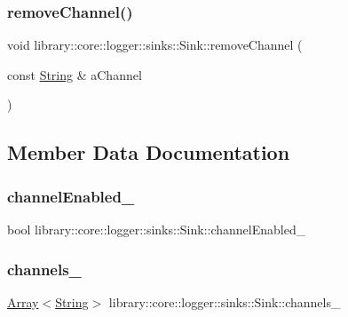 \subsubsection{\texorpdfstring{removeChannel()}{removeChannel()}}
{\footnotesize\ttfamily void library\+::core\+::logger\+::sinks\+::\+Sink\+::remove\+Channel (\begin{DoxyParamCaption}\item[{const \mbox{\hyperlink{classlibrary_1_1core_1_1types_1_1_string}{String}} \&}]{a\+Channel }\end{DoxyParamCaption})}



\subsection{Member Data Documentation}
\mbox{\label{classlibrary_1_1core_1_1logger_1_1sinks_1_1_sink_a48307be32eede5359f345b54363070ae}} 
\subsubsection{\texorpdfstring{channelEnabled\_}{channelEnabled\_}}
{\footnotesize\ttfamily bool library\+::core\+::logger\+::sinks\+::\+Sink\+::channel\+Enabled\+\_\+\hspace{0.3cm}{\ttfamily [protected]}}

\mbox{\label{classlibrary_1_1core_1_1logger_1_1sinks_1_1_sink_a3ba1eb6372e9bf6d2d8b3ff53d529021}} 
\subsubsection{\texorpdfstring{channels\_}{channels\_}}
{\footnotesize\ttfamily \mbox{\hyperlink{classlibrary_1_1core_1_1ctnr_1_1_array}{Array}}$<$\mbox{\hyperlink{classlibrary_1_1core_1_1types_1_1_string}{String}}$>$ library\+::core\+::logger\+::sinks\+::\+Sink\+::channels\+\_\+\hspace{0.3cm}{\ttfamily [protected]}}


